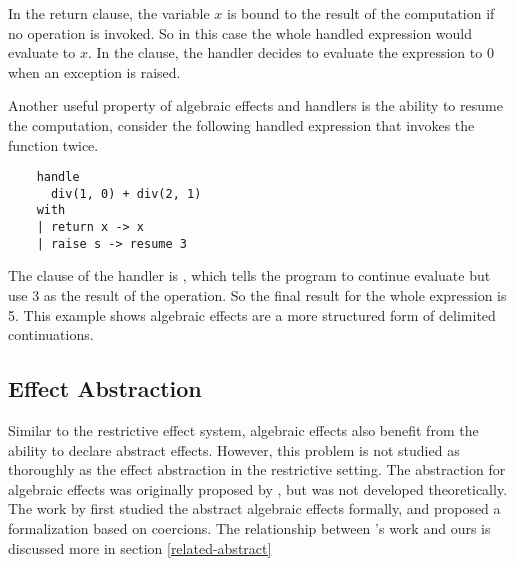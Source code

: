 In the return clause, the variable $x$ is bound to the result of the computation if no operation is invoked. So in this case the whole handled expression would evaluate to $x$. In the  clause, the handler decides to evaluate the expression to 0 when an exception is raised. 

Another useful property of algebraic effects and handlers is the ability to resume the computation, consider the following handled expression that invokes the function  twice.

\begin{verbatim}
	handle 
	  div(1, 0) + div(2, 1)
	with 
	| return x -> x
	| raise s -> resume 3
\end{verbatim}

The  clause of the handler is  , which tells the program to continue evaluate but use 3 as the result of the operation. So the final result for the whole expression is 5. This example shows algebraic effects are a more structured form of delimited continuations. 

\subsection{Effect Abstraction}
Similar to the restrictive effect system, algebraic effects also benefit from the ability to declare abstract effects. However, this problem is not studied as thoroughly as the effect abstraction in the restrictive setting. The abstraction for algebraic effects was originally proposed by \citet{leijen18}, but was not developed theoretically. The work by \citet{biernacki19} first studied the abstract algebraic effects formally, and proposed a formalization based on coercions. The relationship between \citet{biernacki}'s work and ours is discussed more in section \ref{related-abstract}









